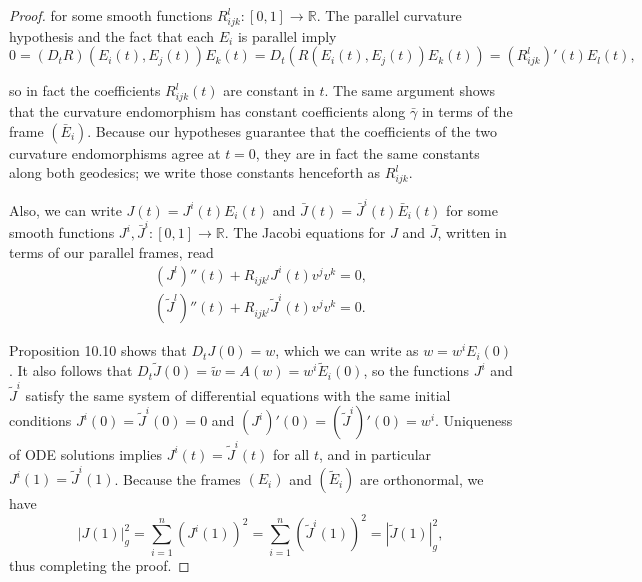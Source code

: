 \begin{proof}
for some smooth functions $R_{ijk}^l : [0, 1] \to \mathbb{R}$. The parallel curvature hypothesis and the fact that each $E_i$ is parallel imply
\[
0 = (D_t R)(E_i(t), E_j(t))E_k(t) = D_t(R(E_i(t), E_j(t))E_k(t)) = (R_{ijk}^l)'(t) E_l(t),
\]

so in fact the coefficients $R_{ijk}^l(t)$ are constant in $t$. The same argument shows that the curvature endomorphism has constant coefficients along $\bar{\gamma}$ in terms of the frame $(\bar{E}_i)$. Because our hypotheses guarantee that the coefficients of the two curvature endomorphisms agree at $t = 0$, they are in fact the same constants along both geodesics; we write those constants henceforth as $R_{ijk}^l$.

Also, we can write $J(t) = J^i(t)E_i(t)$ and $\bar{J}(t) = \bar{J}^i(t)\bar{E}_i(t)$ for some smooth functions $J^i, \bar{J}^i : [0, 1] \to \mathbb{R}$. The Jacobi equations for $J$ and $\bar{J}$, written in terms of our parallel frames, read
\begin{gather*}
(J^l)''(t) + R_{ijk^l}J^i(t)v^j v^k = 0, \\
(\tilde{J}^l)''(t) + R_{ijk^l}\tilde{J}^i(t)v^j v^k = 0.
\end{gather*}

Proposition 10.10 shows that $D_t J(0) = w$, which we can write as $w = w^i E_i(0)$. It also follows that $D_t \tilde{J}(0) = \tilde{w} = A(w) = w^i \tilde{E}_i(0)$, so the functions $J^i$ and $\tilde{J}^i$ satisfy the same system of differential equations with the same initial conditions $J^i(0) = \tilde{J}^i(0) = 0$ and $(J^i)'(0) = (\tilde{J}^i)'(0) = w^i$. Uniqueness of ODE solutions implies $J^i(t) = \tilde{J}^i(t)$ for all $t$, and in particular $J^i(1) = \tilde{J}^i(1)$. Because the frames $(E_i)$ and $(\tilde{E}_i)$ are orthonormal, we have
\[
|J(1)|_g^2 = \sum_{i=1}^n (J^i(1))^2 = \sum_{i=1}^n (\tilde{J}^i(1))^2 = |\tilde{J}(1)|_g^2,
\]
thus completing the proof.
\end{proof}

